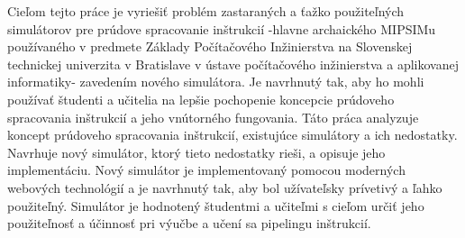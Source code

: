 \bigskip{}

Cieľom tejto práce je vyriešiť problém zastaraných a ťažko použiteľných simulátorov pre prúdove spracovanie inštrukcií -hlavne archaického MIPSIMu používaného v predmete Základy Počítačového Inžinierstva na Slovenskej technickej univerzita v Bratislave
v ústave počítačového inžinierstva a aplikovanej informatiky- 
zavedením nového simulátora. Je navrhnutý tak, aby ho mohli používať študenti a učitelia na lepšie pochopenie koncepcie prúdoveho spracovania inštrukcií a jeho vnútorného fungovania. Táto práca analyzuje koncept prúdoveho spracovania inštrukcií, existujúce simulátory a ich nedostatky. Navrhuje nový simulátor, ktorý tieto nedostatky rieši, a opisuje jeho implementáciu. Nový simulátor je implementovaný pomocou moderných webových technológií a je navrhnutý tak, aby bol užívateľsky prívetivý a ľahko použiteľný. Simulátor je hodnotený študentmi a učiteľmi s cieľom určiť jeho použiteľnosť a účinnosť pri výučbe a učení sa pipelingu inštrukcií.

\newpage{}\thispagestyle{empty}\medskip{}


\newpage{}


\thispagestyle{empty}
\mbox{}
\newpage

